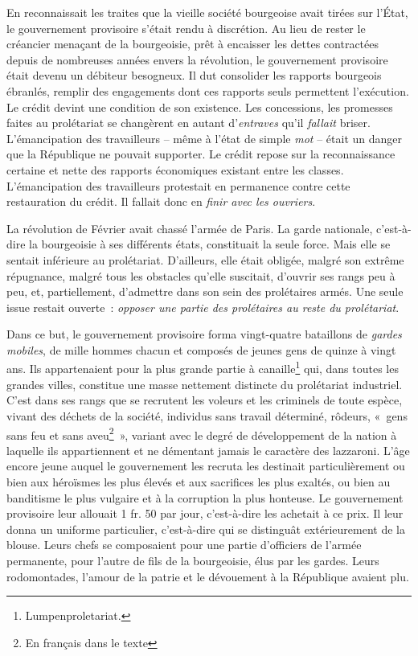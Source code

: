 \documentclass[twoside]{book} %
\begin{document}
En reconnaissait les traites que la vieille société bourgeoise avait tirées sur l’État, le gouvernement provisoire s’était rendu à discrétion. Au lieu de rester le créancier menaçant de la bourgeoisie, prêt à encaisser les dettes contractées depuis de nombreuses années envers la révolution, le gouvernement provisoire était devenu un débiteur besogneux. Il dut consolider les rapports bourgeois ébranlés, remplir des engagements dont ces rapports seuls permettent l’exécution. Le crédit devint une condition de son existence. Les concessions, les promesses faites au prolétariat se changèrent en autant d’\emph{entraves} qu’il \emph{fallait} briser. L’émancipation des travailleurs – même à l’état de simple \emph{mot} – était un danger que la République ne pouvait supporter. Le crédit repose sur la reconnaissance certaine et nette des rapports économiques existant entre les classes. L’émancipation des travailleurs protestait en permanence contre cette restauration du crédit. Il fallait donc en \emph{finir avec les ouvriers}.\par
La révolution de Février avait chassé l’armée de Paris. La garde nationale, c’est-à-dire la bourgeoisie à ses différents états, constituait la seule force. Mais elle se sentait inférieure au prolétariat. D’ailleurs, elle était obligée, malgré son extrême répugnance, malgré tous les obstacles qu’elle suscitait, d’ouvrir ses rangs peu à peu, et, partiellement, d’admettre dans son sein des prolétaires armés. Une seule issue restait ouverte : \emph{opposer une partie des prolétaires au reste du prolétariat}.\par
Dans ce but, le gouvernement provisoire forma vingt-quatre bataillons de \emph{gardes mobiles}, de mille hommes chacun et composés de jeunes gens de quinze à vingt ans. Ils appartenaient pour la plus grande partie à canaille\footnote{Lumpenproletariat.} qui, dans toutes les grandes villes, constitue une masse nettement distincte du prolétariat industriel. C’est dans ses rangs que se recrutent les voleurs et les criminels de toute espèce, vivant des déchets de la société, individus sans travail déterminé, rôdeurs, « gens sans feu et sans aveu\footnote{En français dans le texte} », variant avec le degré de développement de la nation à laquelle ils appartiennent et ne démentant jamais le caractère des lazzaroni. L’âge encore jeune auquel le gouvernement les recruta les destinait particulièrement ou bien aux héroïsmes les plus élevés et aux sacrifices les plus exaltés, ou bien au banditisme le plus vulgaire et à la corruption la plus honteuse. Le gouvernement provisoire leur allouait 1 fr. 50 par jour, c’est-à-dire les achetait à ce prix. Il leur donna un uniforme particulier, c’est-à-dire qui se distinguât extérieurement de la blouse. Leurs chefs se composaient pour une partie d’officiers de l’armée permanente, pour l’autre de fils de la bourgeoisie, élus par les gardes. Leurs rodomontades, l’amour de la patrie et le dévouement à la République avaient plu.\par
\end{document}
